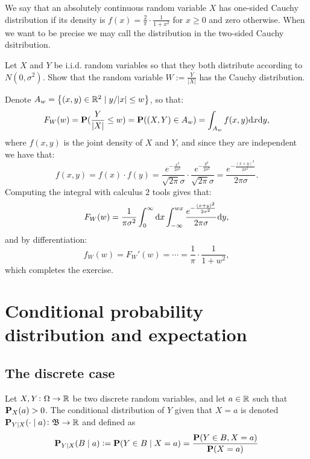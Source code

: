\documentclass[11pt,a4paper]{article}
\begin{document}
\begin{remark}
  We say that an absolutely continuous random variable $X$
  has one-sided Cauchy distribution if its density is
  $f(x) = \frac{2}{\pi} \cdot \frac{1}{1 + x^2}$ for $x \geq 0$
  and zero otherwise.
  When we want to be precise we may call the distribution
  in  the two-sided Cauchy dsitribution.
\end{remark}

\begin{exercise}
  Let $X$ and $Y$ be i.i.d. random variables so that they both
  distribute according to $N(0,\sigma^2)$.
  Show that the random variable $W := \frac{Y}{|X|}$
  has the Cauchy distribution.
\end{exercise}
\begin{solution}
  Denote $A_w = \left\{(x,y) \in \mathbb{R}^2 \mid y/|x| \le w\right\}$,
  so that:
  \[
    F_W(w) =
    \Prob(\frac{Y}{|X|} \le w) =
    \Prob((X,Y) \in A_w) =
    \int_{A_w} f(x,y) \dx \dy,
  \]
  where $f(x,y)$ is the joint density of $X$ and $Y$,
  and since they are independent we have that:
  \[
    f(x,y) = f(x) \cdot f(y) =
    \frac{e^{-\frac{x^2}{2 \sigma^2}}}{\sqrt{2 \pi} \sigma} \cdot
    \frac{e^{-\frac{y^2}{2 \sigma^2}}}{\sqrt{2 \pi} \sigma} =
    \frac{e^{-\frac{(x + y)^2}{2 \sigma^2}}}{2 \pi \sigma}.
  \]
  Computing the integral with calculus $2$ tools
  gives that:
  \[
    F_W(w) =
    \frac{1}{\pi \sigma^2} \int_{0}^{\infty} \dx \int_{-\infty}^{wx}
    \frac{e^{-\frac{(x + y)^2}{2 \sigma^2}}}{2 \pi \sigma} \dy,
  \]
  and by differentiation:
  \[
    f_W(w) = F_W'(w) = \cdots = \frac{1}{\pi} \cdot \frac{1}{1 + w^2},
  \]
  which completes the exercise.
\end{solution}

\newpage

\section{Conditional probability distribution and expectation}
\subsection{The discrete case}

\begin{definition}
  Let $X,Y \colon \Omega \to \mathbb{R}$ be two discrete random variables,
  and let $a \in \mathbb{R}$ such that $\mathbf{P}_X(a) > 0$.
  The conditional distribution of $Y$ given
  that $X = a$ is denoted 
  $\mathbf{P}_{Y \mid X}(\cdot \mid a) \colon \mathfrak B \to \mathbb{R}$ and defined as
  \[
    \mathbf{P}_{Y \mid X}(B \mid a) :=
    \mathbf{P}(Y \in B \mid X = a) =
    \frac{\mathbf{P}(Y \in B, X = a)}{\mathbf{P}(X = a)}
  \]
\end{definition}
\end{document}
